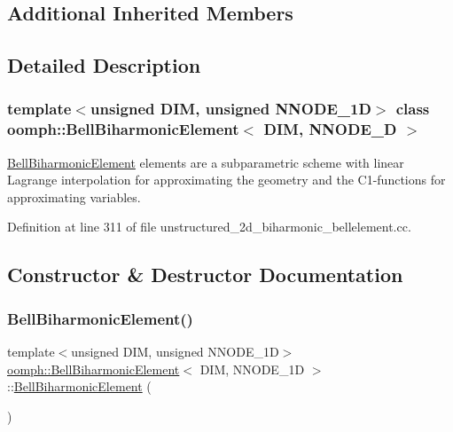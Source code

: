 \subsection*{Additional Inherited Members}


\subsection{Detailed Description}
\subsubsection*{template$<$unsigned D\+IM, unsigned N\+N\+O\+D\+E\+\_\+1D$>$\newline
class oomph\+::\+Bell\+Biharmonic\+Element$<$ D\+I\+M, N\+N\+O\+D\+E\+\_\+D $>$}

\hyperlink{classoomph_1_1BellBiharmonicElement}{Bell\+Biharmonic\+Element} elements are a subparametric scheme with linear Lagrange interpolation for approximating the geometry and the C1-\/functions for approximating variables. 

Definition at line 311 of file unstructured\+\_\+2d\+\_\+biharmonic\+\_\+bellelement.\+cc.



\subsection{Constructor \& Destructor Documentation}
\mbox{\label{classoomph_1_1BellBiharmonicElement_aacb9d267c8aa65057c2c0248b0ef669e}} 
\subsubsection{\texorpdfstring{Bell\+Biharmonic\+Element()}{BellBiharmonicElement()}\hspace{0.1cm}{\footnotesize\ttfamily [1/2]}}
{\footnotesize\ttfamily template$<$unsigned D\+IM, unsigned N\+N\+O\+D\+E\+\_\+1D$>$ \\
\hyperlink{classoomph_1_1BellBiharmonicElement}{oomph\+::\+Bell\+Biharmonic\+Element}$<$ D\+IM, N\+N\+O\+D\+E\+\_\+1D $>$\+::\hyperlink{classoomph_1_1BellBiharmonicElement}{Bell\+Biharmonic\+Element} (\begin{DoxyParamCaption}{ }\end{DoxyParamCaption})\hspace{0.3cm}{\ttfamily [inline]}}



